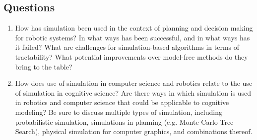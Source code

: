 \documentclass{article}
\begin{document}
\subsection{Questions}

\begin{enumerate}
\item How has simulation been used in the context of planning and decision making for robotic systems? In what ways has been successful, and in what ways has it failed? What are challenges for simulation-based algorithms in terms of tractability? What potential improvements over model-free methods do they bring to the table?
\item How does use of simulation in computer science and robotics relate to the use of simulation in cognitive science? Are there ways in which simulation is used in robotics and computer science that could be applicable to cognitive modeling? Be sure to discuss multiple types of simulation, including probabilistic simulation, simulations in planning (e.g. Monte-Carlo Tree Search), physical simulation for computer graphics, and combinations thereof.
\end{enumerate}
\end{document}
